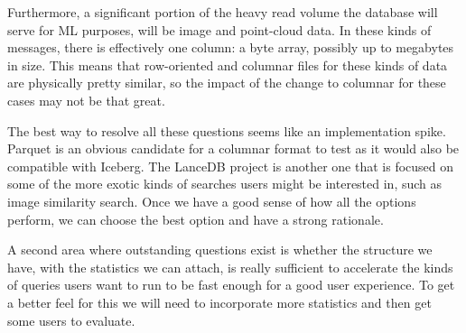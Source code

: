 \documentclass[9pt,twocolumn]{article}
\begin{document}
    Furthermore, a significant portion of the heavy read volume the database
    will serve for ML purposes, will be image and point-cloud data. In these
    kinds of messages, there is effectively one column: a byte array, possibly
    up to megabytes in size. This means that row-oriented and columnar files
    for these kinds of data are physically pretty similar, so the impact of the
    change to columnar for these cases may not be that great.

    The best way to resolve all these questions seems like an implementation
    spike. Parquet is an obvious candidate for a columnar format to test as it
    would also be compatible with Iceberg. The LanceDB \cite{lance} project is
    another one that is focused on some of the more exotic kinds of searches
    users might be interested in, such as image similarity search. Once we have
    a good sense of how all the options perform, we can choose the best option
    and have a strong rationale.

    A second area where outstanding questions exist is whether the structure we
    have, with the statistics we can attach, is really sufficient to accelerate the
    kinds of queries users want to run to be fast enough for a good user
    experience. To get a better feel for this we will need to incorporate more
    statistics and then get some users to evaluate.
\end{document}
